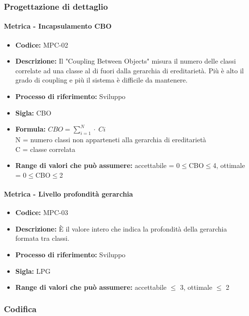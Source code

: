 \subsubsection{Progettazione di dettaglio}
    \paragraph{Metrica - Incapsulamento CBO}
    \begin{itemize}
        \item \textbf{Codice:} MPC-02
        \item \textbf{Descrizione:} Il "Coupling Between Objects" misura il numero delle classi correlate ad una classe al di fuori dalla gerarchia di ereditarietà. Più è alto il grado di coupling e più il sistema è difficile da mantenere.
        \item \textbf{Processo di riferimento:} Sviluppo
        \item \textbf{Sigla:} CBO
        \item \textbf{Formula:} \begin{math}{CBO = {\sum_{i=1}^{N} \cdot \; Ci}}\end{math} \\ N = numero classi non apparteneti alla gerarchia di ereditarietà \\ C = classe correlata
        \item \textbf{Range di valori che può assumere:} accettabile = 0$\leq$CBO$\leq$4, ottimale = 0$\leq$CBO$\leq$2
    \end{itemize}

    \paragraph{Metrica - Livello profondità gerarchia}
    \begin{itemize}
        \item \textbf{Codice:} MPC-03
        \item \textbf{Descrizione:} È il valore intero che indica la profondità della gerarchia formata tra classi.
        \item \textbf{Processo di riferimento:} Sviluppo
        \item \textbf{Sigla:} LPG
        \item \textbf{Range di valori che può assumere:} accettabile $\leq$ 3, ottimale $\leq$ 2
    \end{itemize}

\subsubsection{Codifica}  
